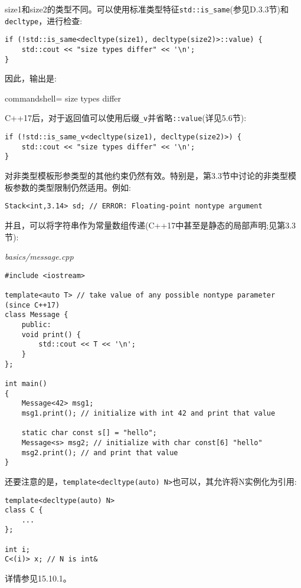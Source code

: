 size1和size2的类型不同。可以使用标准类型特征\texttt{std::is\_same}(参见D.3.3节)和\texttt{decltype}，进行检查:

\begin{lstlisting}[style=styleCXX]
if (!std::is_same<decltype(size1), decltype(size2)>::value) {
	std::cout << "size types differ" << '\n';
}
\end{lstlisting}

因此，输出是:

\begin{tcblisting}{commandshell={}}
size types differ
\end{tcblisting}

C++17后，对于返回值可以使用后缀\texttt{\_v}并省略\texttt{::value}(详见5.6节):

\begin{lstlisting}[style=styleCXX]
if (!std::is_same_v<decltype(size1), decltype(size2)>) {
	std::cout << "size types differ" << '\n';
}
\end{lstlisting}

对非类型模板形参类型的其他约束仍然有效。特别是，第3.3节中讨论的非类型模板参数的类型限制仍然适用。例如:

\begin{lstlisting}[style=styleCXX]
Stack<int,3.14> sd; // ERROR: Floating-point nontype argument
\end{lstlisting}

并且，可以将字符串作为常量数组传递(C++17中甚至是静态的局部声明;见第3.3节):

\noindent
\textit{basics/message.cpp}
\begin{lstlisting}[style=styleCXX]
#include <iostream>

template<auto T> // take value of any possible nontype parameter (since C++17)
class Message {
	public:
	void print() {
		std::cout << T << '\n';
	}
};

int main()
{
	Message<42> msg1;
	msg1.print(); // initialize with int 42 and print that value
	
	static char const s[] = "hello";
	Message<s> msg2; // initialize with char const[6] "hello"
	msg2.print(); // and print that value
}
\end{lstlisting}

还要注意的是，\texttt{template<decltype(auto) N>}也可以，其允许将N实例化为引用:

\begin{lstlisting}[style=styleCXX]
template<decltype(auto) N>
class C {
	...
};

int i;
C<(i)> x; // N is int&
\end{lstlisting}

详情参见15.10.1。





